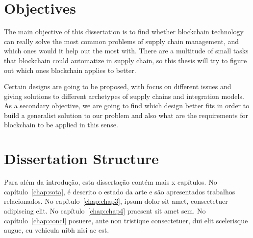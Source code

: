 \section{Objectives}
\label{sec:objectives}
The main objective of this dissertation is to find whether blockchain technology can really solve the most common problems of supply chain management, and which ones would it help out the most with. There are a multitude of small tasks that blockchain could automatize in supply chain, so this thesis will try to figure out which ones blockchain applies to better. 

Certain designs are going to be proposed, with focus on different issues and giving solutions to different archetypes of supply chains and integration models. As a secondary objective, we are going to find which design better fits in order to build a generalist solution to our problem and also what are the requirements for blockchain to be applied in this sense.

\section{Dissertation Structure} \label{sec:struct}

Para além da introdução, esta dissertação contém mais x capítulos.
No capítulo~\ref{chap:sota}, é descrito o estado da arte e são
apresentados trabalhos relacionados. 
No capítulo~\ref{chap:chap3}, ipsum dolor sit amet, consectetuer
adipiscing elit.
No capítulo~\ref{chap:chap4} praesent sit amet sem. 
No capítulo~\ref{chap:concl}  posuere, ante non tristique
consectetuer, dui elit scelerisque augue, eu vehicula nibh nisi ac
est. 
